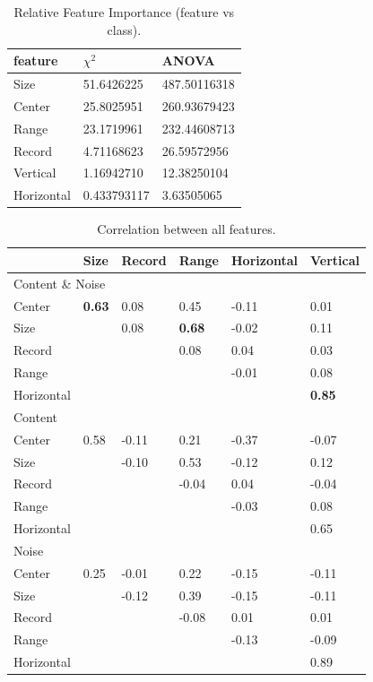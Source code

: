 \begin{table}[h]
\centering
\caption{Relative Feature Importance (feature vs class).}
\label{tab:importance}
\begin{tabular}{| l | l | l |}
\hline
feature & $\chi^2$ & ANOVA \\
\hline
Size       & 51.6426225  & 487.50116318 \\
Center     & 25.8025951  & 260.93679423 \\
Range      & 23.1719961  & 232.44608713 \\
Record     & 4.71168623  & 26.59572956 \\
Vertical   & 1.16942710  & 12.38250104 \\
Horizontal & 0.433793117 & 3.63505065 \\
\hline
\end{tabular}
\end{table}
         
\begin{table}[h]
\centering
\caption{Correlation between all features.}
\label{tab:featcorr}
\begin{tabular}{ | l | l | l | l | l | l |}
\hline
& Size & Record & Range & Horizontal & Vertical \\ \hline
\multicolumn{6}{|l|}{Content \& Noise} \\
\hline
Center & \textbf{0.63} & 0.08 & 0.45 & -0.11 & 0.01 \\
Size & & 0.08 & \textbf{0.68} & -0.02 & 0.11 \\
Record & & & 0.08 & 0.04 & 0.03 \\
Range & & & & -0.01 & 0.08 \\
Horizontal & & & & & \textbf{0.85} \\
\hline
\multicolumn{6}{|l|}{Content} \\
\hline
Center & 0.58 & -0.11 & 0.21 & -0.37 & -0.07 \\
Size & & -0.10 & 0.53 & -0.12 & 0.12 \\
Record & & & -0.04 & 0.04 & -0.04 \\
Range & & & & -0.03 & 0.08 \\
Horizontal & & & & & 0.65 \\
\hline
\multicolumn{6}{|l|}{Noise} \\
\hline
Center & 0.25 & -0.01 & 0.22 & -0.15 & -0.11 \\
Size & & -0.12 & 0.39 & -0.15 & -0.11 \\
Record & & & -0.08 & 0.01 & 0.01 \\
Range & & & & -0.13 & -0.09 \\
Horizontal & & & & & 0.89 \\
\hline
\end{tabular}
\end{table}


